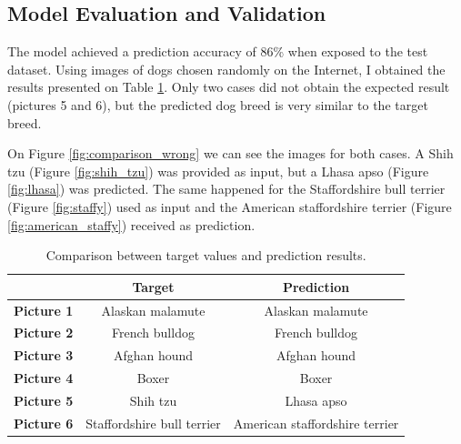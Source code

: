 \documentclass{article}
\begin{document}
    \subsection{Model Evaluation and Validation}

    The model achieved a prediction accuracy of 86\% when exposed to the test dataset. Using images of dogs chosen randomly on the Internet, I obtained the results presented on Table \ref*{tab:target_pred}. Only two cases did not obtain the expected result (pictures 5 and 6), but the predicted dog breed is very similar to the target breed.
    
    On Figure \ref*{fig:comparison_wrong} we can see the images for both cases. A Shih tzu (Figure \ref*{fig:shih_tzu}) was provided as input, but a Lhasa apso (Figure \ref*{fig:lhasa}) was predicted. The same happened for the Staffordshire bull terrier (Figure \ref*{fig:staffy}) used as input and the American staffordshire terrier (Figure \ref*{fig:american_staffy}) received as prediction.
    
    \begin{table}[htbp]
        \centering
        \begin{tabular}{c|c|c}
             & \textbf{Target} & \textbf{Prediction} \\
            \hline
            \textbf{Picture 1} & Alaskan malamute & Alaskan malamute \\
            \textbf{Picture 2} & French bulldog & French bulldog \\
            \textbf{Picture 3} & Afghan hound & Afghan hound \\
            \textbf{Picture 4} & Boxer & Boxer \\
            \textbf{Picture 5} & Shih tzu & Lhasa apso \\
            \textbf{Picture 6} & Staffordshire bull terrier & American staffordshire terrier \\
        \end{tabular}
        \caption{Comparison between target values and prediction results.}
        \label{tab:target_pred}
    \end{table}
\end{document}
